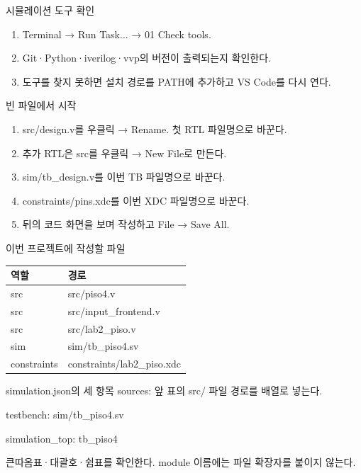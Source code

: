 \begin{frame}{시뮬레이션 도구 확인}
\small
\begin{enumerate}
\item Terminal → Run Task... → 01 Check tools.
\item Git·Python·iverilog·vvp의 버전이 출력되는지 확인한다.
\item 도구를 찾지 못하면 설치 경로를 PATH에 추가하고 VS Code를 다시 연다.
\end{enumerate}
\end{frame}

\begin{frame}{빈 파일에서 시작}
\small
\begin{enumerate}
\item src/design.v를 우클릭 → Rename. 첫 RTL 파일명으로 바꾼다.
\item 추가 RTL은 src를 우클릭 → New File로 만든다.
\item sim/tb\_design.v를 이번 TB 파일명으로 바꾼다.
\item constraints/pins.xdc를 이번 XDC 파일명으로 바꾼다.
\item 뒤의 코드 화면을 보며 작성하고 File → Save All.
\end{enumerate}
\end{frame}

\begin{frame}{이번 프로젝트에 작성할 파일}
\small
\begin{center}\renewcommand{\arraystretch}{1.55}\begin{tabular}{ll}
역할 & 경로\\\hline
src & src/piso4.v\\
src & src/input\_frontend.v\\
src & src/lab2\_piso.v\\
sim & sim/tb\_piso4.sv\\
constraints & constraints/lab2\_piso.xdc\\
\end{tabular}\end{center}
\end{frame}

\begin{frame}{simulation.json의 세 항목}
\small
sources: 앞 표의 src/ 파일 경로를 배열로 넣는다.\par\vspace{0.26cm}testbench: sim/tb\_piso4.sv\par\vspace{0.26cm}simulation\_top: tb\_piso4\par\vspace{0.26cm}큰따옴표·대괄호·쉼표를 확인한다. module 이름에는 파일 확장자를 붙이지 않는다.\par
\end{frame}

